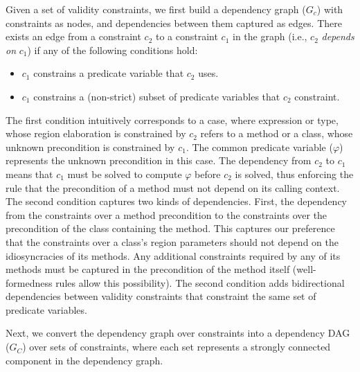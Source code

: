 Given a set of validity constraints, we first build a dependency graph
($G_c$) with constraints as nodes, and dependencies between them
captured as edges. There exists an edge from a constraint $c_2$ to a
constraint $c_1$ in the graph (i.e., $c_2$ \emph{depends on} $c_1$) if
any of the following conditions hold:
\begin{itemize}
\item $c_1$ constrains a predicate variable that $c_2$ uses. 
\item $c_1$ constrains a (non-strict) subset of predicate variables
that $c_2$ constraint.
\end{itemize}
The first condition intuitively corresponds to a case, where
expression or type, whose region elaboration is constrained by $c_2$
refers to a method or a class, whose unknown precondition is
constrained by $c_1$. The common predicate variable ($\varphi$)
represents the unknown precondition in this case. The dependency from
$c_2$ to $c_1$ means that $c_1$ must be solved to compute $\varphi$
before $c_2$ is solved, thus enforcing the rule that the precondition
of a method must not depend on its calling context. 
The second condition captures two kinds of dependencies. First, the
dependency from the constraints over a method precondition to the
constraints over the precondition of the class containing the method.
This captures our preference that the constraints over a class's
region parameters should not depend on the idiosyncracies of its
methods. Any additional constraints required by any of its methods
must be captured in the precondition of the method itself
(well-formedness rules allow this possibility). The second condition
adds bidirectional dependencies between validity constraints that
constraint the same set of predicate variables. 

Next, we convert the dependency graph over constraints into a
dependency DAG ($G_C$) over sets of constraints, where each set
represents a strongly connected component in the dependency graph.

